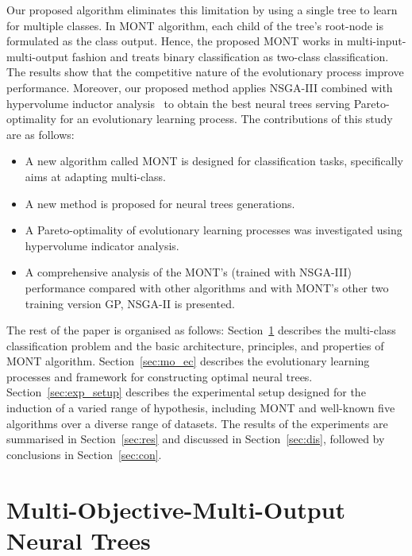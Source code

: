 \documentclass[conference]{IEEEtran}
\begin{document}
Our proposed algorithm eliminates this limitation by using a single tree to learn for multiple classes. In MONT algorithm, each child of the tree's root-node is formulated as the class output. Hence, the proposed MONT works in multi-input-multi-output fashion and treats binary classification as two-class classification. The results show that the competitive nature of the evolutionary process improve performance. Moreover, our proposed method applies NSGA-III combined with hypervolume inductor analysis~\cite{fonseca2006improved} to obtain the best neural trees serving Pareto-optimality for an evolutionary learning process. The contributions of this study are as follows: \begin{itemize}
    \item A new algorithm called MONT is designed for classification tasks, specifically aims at adapting multi-class.
    \item A new method is proposed for neural trees generations.
    \item A Pareto-optimality of evolutionary learning processes was investigated using hypervolume indicator analysis. 
    \item A comprehensive analysis of the MONT's (trained with NSGA-III) performance compared with other algorithms and with MONT's other two training version GP, NSGA-II is presented.
\end{itemize}
The rest of the paper is organised as follows: Section~\ref{sec:mont} describes the multi-class classification problem and the basic architecture, principles, and properties of MONT algorithm. Section~\ref{sec:mo_ec} describes the evolutionary learning processes and framework for constructing optimal neural trees. Section~\ref{sec:exp_setup} describes the experimental setup designed for the induction of a varied range of hypothesis, including MONT and well-known five algorithms over a diverse range of datasets. The results of the experiments are summarised in Section~\ref{sec:res} and discussed in Section~\ref{sec:dis}, followed by conclusions in Section~\ref{sec:con}.
\section{Multi-Objective-Multi-Output Neural Trees}
\label{sec:mont}
\end{document}
